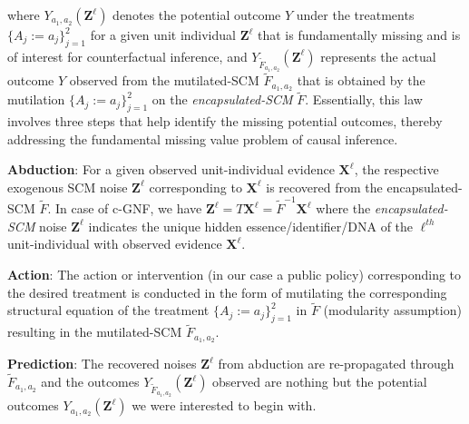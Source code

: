 \documentclass[letterpaper]{article} %
\begin{document}
where $Y_{a_1,a_2}(\mathbf{Z}^\ell)$ denotes the potential outcome $Y$ under the treatments $\{{A_j}{ := }a_j\}^2_{j{ = }1}$ for a given unit individual $\mathbf{Z}^\ell$ that is fundamentally missing and is of interest for counterfactual inference, and $Y_{\tilde{F}_{a_1,a_2}}(\mathbf{Z}^\ell)$ represents the actual outcome $Y$ observed from the mutilated-SCM $\tilde{F}_{a_1,a_2}$ that is obtained by the mutilation $\{{A_j}{ := }a_j\}^2_{j{ = }1}$ on the \emph{encapsulated-SCM} $\tilde{F}$. Essentially, this law involves three steps that help identify the missing potential outcomes, thereby addressing the fundamental missing value problem of causal inference.
\begin{inparaenum}

    \item \textbf{Abduction}: For a given observed unit-individual evidence $\mathbf{X}^\ell$, the respective exogenous SCM noise $\mathbf{Z}^\ell$ corresponding to $\mathbf{X}^\ell$ is recovered from the encapsulated-SCM $\tilde{F}$. In case of c-GNF, we have $\mathbf{Z}^\ell{ = }T\mathbf{X}^\ell{ = }\tilde{F}^{-1}\mathbf{X}^\ell$ where the \emph{encapsulated-SCM} noise $\mathbf{Z}^\ell$
   indicates the unique hidden essence/identifier/DNA
    of the $\ell^{th}$ unit-individual with observed evidence $\mathbf{X}^\ell$.

    \item \textbf{Action}: The action or intervention (in our case a public policy) corresponding to the desired treatment is conducted in the form of mutilating the corresponding structural equation of the treatment $\{{A_j}{ := }a_j\}^2_{j{ = }1}$ in $\tilde{F}$ (modularity assumption) resulting in the mutilated-SCM $\tilde{F}_{a_1,a_2}$.

    \item \textbf{Prediction}: The recovered noises $\mathbf{Z}^\ell$ from abduction are re-propagated through $\tilde{F}_{a_1,a_2}$ and the outcomes $Y_{\tilde{F}_{a_1,a_2}}(\mathbf{Z}^\ell)$ observed are nothing but the potential outcomes $Y_{a_1,a_2}(\mathbf{Z}^\ell)$ we were interested to begin with.%
\end{inparaenum}
\end{document}
